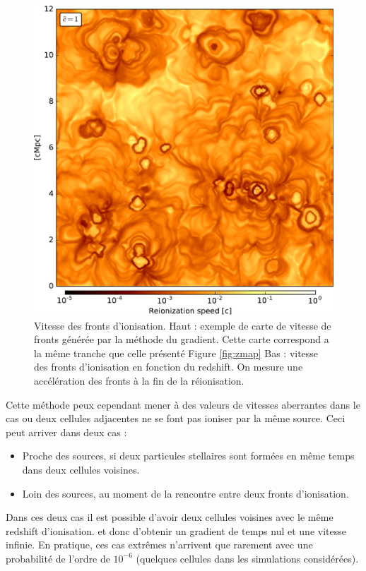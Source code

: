 \begin{figure}
        \includegraphics[width=.95\linewidth]{img/04_mapreio/map_v_c1.pdf} 
        
        \caption[Vitesse des fronts d'ionisation]{Vitesse des fronts d'ionisation.
        Haut : exemple de carte de vitesse de fronts générée par la méthode du gradient.
		Cette carte correspond a la même tranche que celle présenté Figure \ref{fig:zmap}
		Bas : vitesse des fronts d'ionisation en fonction du redshift.
        On mesure une accélération des fronts à la fin de la réionisation.
        }
 		\label{fig:vmap}
\end{figure}

Cette méthode peux cependant mener à des valeurs de vitesses aberrantes dans le cas ou deux cellules adjacentes ne se font pas ioniser par la même source.
Ceci peut arriver dans deux cas : 
\begin{itemize}
\item Proche des sources, si deux particules stellaires sont formées en même temps dans deux cellules voisines.
\item Loin des sources, au moment de la rencontre entre deux fronts d'ionisation.
\end{itemize}

Dans ces deux cas il est possible d'avoir deux cellules voisines avec le même redshift d'ionisation. et donc d'obtenir un gradient de temps nul et une vitesse infinie.
En pratique, ces cas extrêmes n'arrivent que rarement avec une probabilité de l'ordre de $10^{-6}$ (quelques cellules dans les simulations considérées).





